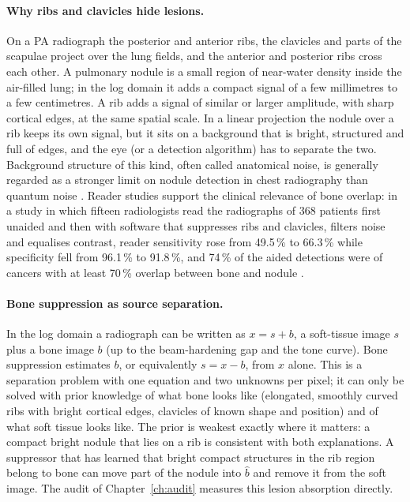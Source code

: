 \paragraph{Why ribs and clavicles hide lesions.} On a PA radiograph the posterior and anterior ribs, the clavicles and parts of the scapulae
project over the lung fields, and the anterior and posterior ribs cross each other. A pulmonary nodule is a small region of near-water density
inside the air-filled lung; in the log domain it adds a compact signal of a few millimetres to a few centimetres. A rib adds a signal of similar or
larger amplitude, with sharp cortical edges, at the same spatial scale. In a linear projection the nodule over a rib keeps its own signal, but it
sits on a background that is bright, structured and full of edges, and the eye (or a detection algorithm) has to separate the two. Background
structure of this kind, often called anatomical noise, is generally regarded as a stronger limit on nodule detection in chest radiography than
quantum noise \citep{samei1999detection}. Reader studies support the clinical relevance
of bone overlap: in a study in which fifteen radiologists read the radiographs of 368 patients first unaided and then with software that
suppresses ribs and clavicles, filters noise and equalises contrast, reader sensitivity rose from 49.5\,\% to 66.3\,\% while specificity fell from
96.1\,\% to 91.8\,\%, and 74\,\% of the aided detections were of cancers with at least 70\,\% overlap between bone and nodule \citep{freedman2011lung}.

\paragraph{Bone suppression as source separation.} In the log domain a radiograph can be written as $x=s+b$, a soft-tissue image $s$ plus a bone
image $b$ (up to the beam-hardening gap and the tone curve). Bone suppression estimates $b$, or equivalently $s=x-b$, from $x$ alone. This is a
separation problem with one equation and two unknowns per pixel; it can only be solved with prior knowledge of what bone looks like (elongated,
smoothly curved ribs with bright cortical edges, clavicles of known shape and position) and of what soft tissue looks like. The prior is weakest
exactly where it matters: a compact bright nodule that lies on a rib is consistent with both explanations. A suppressor that has learned that
bright compact structures in the rib region belong to bone can move part of the nodule into $\hat b$ and remove it from the soft image. The audit
of Chapter~\ref{ch:audit} measures this lesion absorption directly.

